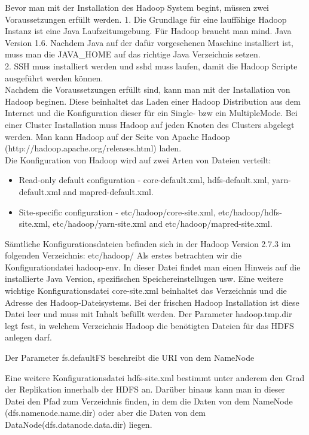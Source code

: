 Bevor man mit der Installation des Hadoop System begint, müssen zwei Voraussetzungen erfüllt werden.
1. Die Grundlage für eine lauffähige Hadoop Instanz ist eine Java Laufzeitumgebung. Für Hadoop braucht man mind. Java Version 1.6.
Nachdem Java auf der dafür vorgesehenen Maschine installiert ist, muss man die JAVA\_HOME auf das richtige Java Verzeichnis setzen.\\
2. SSH muss installiert werden und sshd muss laufen, damit die Hadoop Scripte ausgeführt werden können.\\
Nachdem die Voraussetzungen erfüllt sind, kann man mit der Installation von Hadoop beginen. Diese beinhaltet das Laden einer Hadoop Distribution aus dem Internet und die Konfiguration dieser für ein Single- bzw ein MultipleMode. Bei einer Cluster Installation muss Hadoop auf jeden Knoten des Clusters abgelegt werden.
Man kann Hadoop auf der Seite von Apache Hadoop  (http://hadoop.apache.org/releases.html) laden.\\
Die Konfiguration von Hadoop wird auf zwei Arten von Dateien verteilt:
\begin{itemize}
\item Read-only default configuration - core-default.xml, hdfs-default.xml, yarn-default.xml and mapred-default.xml.
\item Site-specific configuration - etc/hadoop/core-site.xml, etc/hadoop/hdfs-site.xml, etc/hadoop/yarn-site.xml and etc/hadoop/mapred-site.xml.
\end{itemize}
\cite{hadoopConfiguration}


Sämtliche Konfigurationsdateien befinden sich in der Hadoop Version 2.7.3 im folgenden Verzeichnis: etc/hadoop/
Als erstes betrachten wir die Konfigurationdatei hadoop-env. In dieser Datei findet man einen Hinweis auf die installierte Java Version, spezifischen Speichereinstellugen usw. 
Eine weitere wichtige Konfigurationsdatei core-site.xml beinhaltet das Verzeichnis und die Adresse des Hadoop-Dateisystems. Bei der frischen Hadoop Installation ist diese Datei leer und muss mit Inhalt befüllt werden.
Der Parameter hadoop.tmp.dir legt fest, in welchem Verzeichnis Hadoop die benötigten Dateien für das HDFS anlegen darf.

Der Parameter fs.defaultFS beschreibt die URI von dem NameNode

Eine weitere Konfigurationsdatei hdfs-site.xml bestimmt unter anderem den Grad der Replikation innerhalb der HDFS an.
Darüber hinaus kann man in dieser Datei den Pfad zum Verzeichnis finden, in dem die Daten von dem NameNode (dfs.namenode.name.dir) oder aber die Daten von dem DataNode(dfs.datanode.data.dir) liegen.

